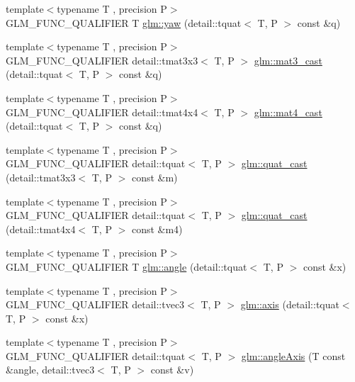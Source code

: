 \begin{DoxyCompactItemize}
\item 
{\footnotesize template$<$typename T , precision P$>$ }\\G\+L\+M\+\_\+\+F\+U\+N\+C\+\_\+\+Q\+U\+A\+L\+I\+F\+I\+ER T \hyperlink{group__gtc__quaternion_ga1de7653ddf380ff06d2300eea831664c}{glm\+::yaw} (detail\+::tquat$<$ T, P $>$ const \&q)
\item 
{\footnotesize template$<$typename T , precision P$>$ }\\G\+L\+M\+\_\+\+F\+U\+N\+C\+\_\+\+Q\+U\+A\+L\+I\+F\+I\+ER detail\+::tmat3x3$<$ T, P $>$ \hyperlink{group__gtc__quaternion_ga65257c3494022ad80a50ce11da95049d}{glm\+::mat3\+\_\+cast} (detail\+::tquat$<$ T, P $>$ const \&q)
\item 
{\footnotesize template$<$typename T , precision P$>$ }\\G\+L\+M\+\_\+\+F\+U\+N\+C\+\_\+\+Q\+U\+A\+L\+I\+F\+I\+ER detail\+::tmat4x4$<$ T, P $>$ \hyperlink{group__gtc__quaternion_gafc4e34c836f7ccb5f3bb2a0373c831e0}{glm\+::mat4\+\_\+cast} (detail\+::tquat$<$ T, P $>$ const \&q)
\item 
{\footnotesize template$<$typename T , precision P$>$ }\\G\+L\+M\+\_\+\+F\+U\+N\+C\+\_\+\+Q\+U\+A\+L\+I\+F\+I\+ER detail\+::tquat$<$ T, P $>$ \hyperlink{group__gtc__quaternion_gafb826745dedb1760100bbd25d0f63fde}{glm\+::quat\+\_\+cast} (detail\+::tmat3x3$<$ T, P $>$ const \&m)
\item 
{\footnotesize template$<$typename T , precision P$>$ }\\G\+L\+M\+\_\+\+F\+U\+N\+C\+\_\+\+Q\+U\+A\+L\+I\+F\+I\+ER detail\+::tquat$<$ T, P $>$ \hyperlink{group__gtc__quaternion_ga385af22ef1a45c4464ddd28b80d5ce18}{glm\+::quat\+\_\+cast} (detail\+::tmat4x4$<$ T, P $>$ const \&m4)
\item 
{\footnotesize template$<$typename T , precision P$>$ }\\G\+L\+M\+\_\+\+F\+U\+N\+C\+\_\+\+Q\+U\+A\+L\+I\+F\+I\+ER T \hyperlink{group__gtc__quaternion_ga23a3fc7ada5bbb665ff84c92c6e0542c}{glm\+::angle} (detail\+::tquat$<$ T, P $>$ const \&x)
\item 
{\footnotesize template$<$typename T , precision P$>$ }\\G\+L\+M\+\_\+\+F\+U\+N\+C\+\_\+\+Q\+U\+A\+L\+I\+F\+I\+ER detail\+::tvec3$<$ T, P $>$ \hyperlink{group__gtc__quaternion_ga8eef9f8c3f2e4836dccf09df975b20fb}{glm\+::axis} (detail\+::tquat$<$ T, P $>$ const \&x)
\item 
{\footnotesize template$<$typename T , precision P$>$ }\\G\+L\+M\+\_\+\+F\+U\+N\+C\+\_\+\+Q\+U\+A\+L\+I\+F\+I\+ER detail\+::tquat$<$ T, P $>$ \hyperlink{group__gtc__quaternion_ga771b3e16cca8324e7111b923476be666}{glm\+::angle\+Axis} (T const \&angle, detail\+::tvec3$<$ T, P $>$ const \&v)

\end{DoxyCompactItemize}
